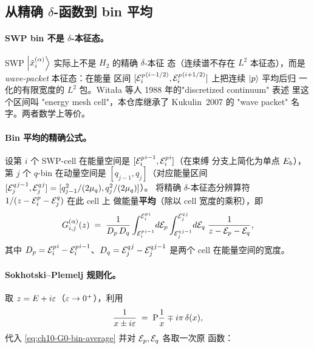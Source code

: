\subsection{从精确 \(\delta\)-函数到 bin 平均}
\label{subsec:ch10-from-delta-to-bin}

\paragraph{SWP bin 不是 \(\delta\)-本征态。}
SWP \(\ket{\tilde{x}_i^{(\alpha)}}\) 实际上不是 \(H_2\) 的精确 \(\delta\)-本征
态（连续谱不存在 \(L^2\) 本征态），而是 \emph{wave-packet} 本征态：在能量
区间 \([{\mathcal{E}_{i}^{p}}^{(i-1/2)}, {\mathcal{E}_{i}^{p}}^{(i+1/2)}]\) 上把连续 \(\ket{p}\) 平均后归
一化的有限宽度的 \(L^2\) 包。Witała 等人 1988 年的"discretized continuum"
表述 \cite{Witala1988}里这个区间叫 "energy mesh cell"，本仓库继承了
Kukulin~2007 \cite{Kukulin2007} 的 "wave packet" 名字。两者数学上等价。

\paragraph{Bin 平均的精确公式。}
设第 \(i\) 个 SWP-cell 在能量空间是 \([{\mathcal{E}_{i}^{p}}^{i-1}, {\mathcal{E}_{i}^{p}}^{i}]\)（在束缚
分支上简化为单点 \(E_b\)），第 \(j\) 个 \(q\)-bin 在动量空间是
\([q_{j-1}, q_j]\)（对应能量区间
\([{\mathcal{E}_{j}^{q}}^{j-1}, {\mathcal{E}_{j}^{q}}^{j}] = [q_{j-1}^2/(2\mu_q), q_{j}^2/(2\mu_q)]\)）。
将精确 \(\delta\)-本征态分辨算符 \(1/(z - {\mathcal{E}_{i}^{p}} - {\mathcal{E}_{j}^{q}})\) 在此 cell 上
做能量\textbf{平均}（除以 cell 宽度的乘积），即
\begin{equation}
\label{eq:ch10-G0-bin-average}
G_{i,j}^{(\alpha)}(z)
\;=\;
\frac{1}{D_p\, D_q}
\int_{{\mathcal{E}_{i}^{p}}^{i-1}}^{{\mathcal{E}_{i}^{p}}^{i}}\! d\mathcal{E}_p
\int_{{\mathcal{E}_{j}^{q}}^{j-1}}^{{\mathcal{E}_{j}^{q}}^{j}}\! d\mathcal{E}_q\;
\frac{1}{z - \mathcal{E}_p - \mathcal{E}_q},
\end{equation}
其中 \(D_p = {\mathcal{E}_{i}^{p}}^{i} - {\mathcal{E}_{i}^{p}}^{i-1}\)、\(D_q = {\mathcal{E}_{j}^{q}}^{j} - {\mathcal{E}_{j}^{q}}^{j-1}\)
是两个 cell 在能量空间的宽度。

\paragraph{Sokhotski--Plemelj 规则化。}
取 \(z = E + i\varepsilon\)（\(\varepsilon \to 0^{+}\)），利用
\begin{equation}
\label{eq:ch10-SP}
\frac{1}{x \pm i\varepsilon}
\;=\;
\mathrm{P}\frac{1}{x} \mp i\pi\, \delta(x),
\end{equation}
代入 \cref{eq:ch10-G0-bin-average} 并对 \(\mathcal{E}_p, \mathcal{E}_q\) 各取一次原
函数：


